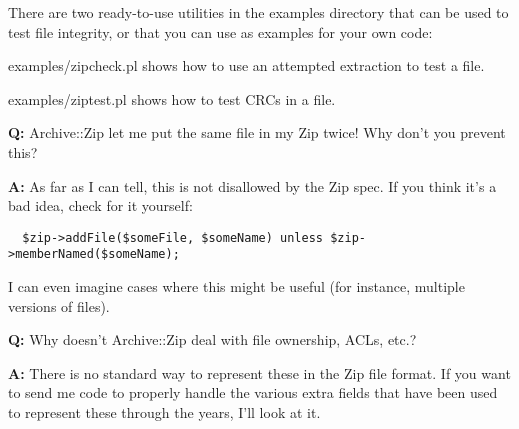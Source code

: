 \documentclass[]{article}
\let\realtextbf=\textbf
\renewcommand{\textbf}[1]{\textcolor{boldcolor}{\realtextbf{#1}}}
\begin{document}
There are two ready-to-use utilities in the examples directory that can
be used to test file integrity, or that you can use as examples for your
own code:

\begin{description}
\item[examples/zipcheck.pl shows how to use an attempted extraction to
test a file.]
\end{description}

\begin{description}
\item[examples/ziptest.pl shows how to test CRCs in a file.]
\end{description}


\textbf{Q:} Archive::Zip let me put the same file in my Zip twice! Why
don't you prevent this?

\textbf{A:} As far as I can tell, this is not disallowed by the Zip
spec. If you think it's a bad idea, check for it yourself:

\begin{verbatim}
  $zip->addFile($someFile, $someName) unless $zip->memberNamed($someName);
\end{verbatim}

I can even imagine cases where this might be useful (for instance,
multiple versions of files).


\textbf{Q:} Why doesn't Archive::Zip deal with file ownership, ACLs,
etc.?

\textbf{A:} There is no standard way to represent these in the Zip file
format. If you want to send me code to properly handle the various extra
fields that have been used to represent these through the years, I'll
look at it.

\end{document}
